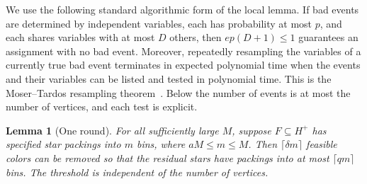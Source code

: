 \documentclass[11pt]{article}
\newtheorem{lemma}[theorem]{Lemma}
\theoremstyle{definition}\newtheorem{algorithm}{Algorithm}[section]
\numberwithin{equation}{section}
\theoremstyle{remark}\newtheorem*{remark}{Remark}
\begin{document}
We use the following standard algorithmic form of the local lemma.
If bad events are determined by independent variables, each has
probability at most $p$, and each shares variables with at most $D$
others, then $ep(D+1)\le1$ guarantees an assignment with no bad event.
Moreover, repeatedly resampling the variables of a currently true bad
event terminates in expected polynomial time when the events and their
variables can be listed and tested in polynomial time. This is the
Moser--Tardos resampling theorem~\cite{MT}. Below the number of events
is at most the number of vertices, and each test is explicit.

\begin{lemma}[One round]\label{lem:warm-round}
For all sufficiently large $M$, suppose $F\subseteq H^+$ has specified
star packings into $m$ bins, where $aM\le m\le M$.
Then $\lceil\delta m\rceil$ feasible colors can be removed so that the
residual stars have packings into at most $\lceil qm\rceil$ bins.
The threshold is independent of the number of vertices.
\end{lemma}
\end{document}
